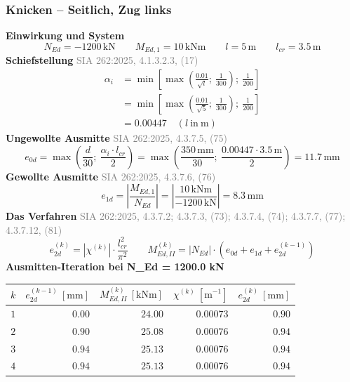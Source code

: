 \documentclass[11pt,a4paper]{article}
\newcommand{\normref}[1]{{\small\textcolor{gray}{#1}}}
\begin{document}
\subsubsection{Knicken – Seitlich, Zug links}
\noindent\textbf{Einwirkung und System}
\begin{equation*}
N_{Ed} = -1200\,\mathrm{kN} \qquad M_{Ed,1} = 10\,\mathrm{kNm} \qquad l = 5\,\mathrm{m} \qquad l_{cr} = 3.5\,\mathrm{m}
\end{equation*}
\noindent\textbf{Schiefstellung} \hfill \normref{SIA 262:2025, 4.1.3.2.3, (17)}
\begin{equation*}
\begin{aligned}
  \alpha_i &= \min\left[\max\left(\frac{0.01}{\sqrt{l}};\ \frac{1}{300}\right);\ \frac{1}{200}\right] \\
  &= \min\left[\max\left(\frac{0.01}{\sqrt{5}};\ \frac{1}{300}\right);\ \frac{1}{200}\right] \\
  &= 0.00447 \quad \left(l\ \text{in}\ \mathrm{m}\right)
\end{aligned}
\end{equation*}
\noindent\textbf{Ungewollte Ausmitte} \hfill \normref{SIA 262:2025, 4.3.7.5, (75)}
\begin{equation*}
e_{0d} = \max\left(\frac{d}{30};\ \frac{\alpha_i \cdot l_{cr}}{2}\right) = \max\left(\frac{350\,\mathrm{mm}}{30};\ \frac{0.00447 \cdot 3.5\,\mathrm{m}}{2}\right) = 11.7\,\mathrm{mm}
\end{equation*}
\noindent\textbf{Gewollte Ausmitte} \hfill \normref{SIA 262:2025, 4.3.7.6, (76)}
\begin{equation*}
e_{1d} = \left|\frac{M_{Ed,1}}{N_{Ed}}\right| = \left|\frac{10\,\mathrm{kNm}}{-1200\,\mathrm{kN}}\right| = 8.3\,\mathrm{mm}
\end{equation*}
\noindent\textbf{Das Verfahren} \hfill \normref{SIA 262:2025, 4.3.7.2; 4.3.7.3, (73); 4.3.7.4, (74); 4.3.7.7, (77); 4.3.7.12, (81)}
\begin{equation*}
e_{2d}^{(k)} = \left|\chi^{(k)}\right| \cdot \frac{l_{cr}^{2}}{\pi^{2}} \qquad M_{Ed,II}^{(k)} = \left|N_{Ed}\right| \cdot \left(e_{0d} + e_{1d} + e_{2d}^{(k-1)}\right)
\end{equation*}
\noindent\textbf{Ausmitten-Iteration bei N\_Ed = 1200.0 kN}
\begin{longtable}{rrrrr}
\hline
$k$ & $e_{2d}^{(k-1)}\ [\mathrm{mm}]$ & $M_{Ed,II}^{(k)}\ [\mathrm{kNm}]$ & $\chi^{(k)}\ [\mathrm{m}^{-1}]$ & $e_{2d}^{(k)}\ [\mathrm{mm}]$ \\
\hline
\endhead
$1$ & $0.00$ & $24.00$ & $0.00073$ & $0.90$ \\
$2$ & $0.90$ & $25.08$ & $0.00076$ & $0.94$ \\
$3$ & $0.94$ & $25.13$ & $0.00076$ & $0.94$ \\
$4$ & $0.94$ & $25.13$ & $0.00076$ & $0.94$ \\
\hline
\end{longtable}
\end{document}
